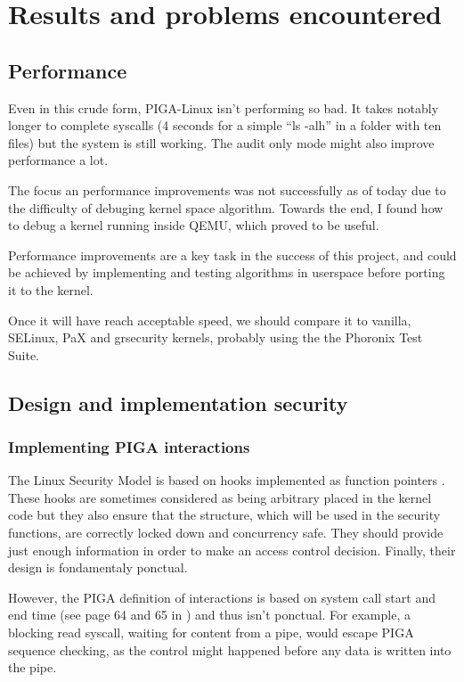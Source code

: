 \documentclass[pdftex,a4paper,titlepage,11pt]{article}
\begin{document}
\newpage

\section{Results and problems encountered}

\subsection{Performance}

Even in this crude form, PIGA-Linux isn't performing so bad. It takes notably
longer to complete syscalls (4 seconds for a simple ``ls -alh'' in a folder with
ten files) but the system is still working. The audit only mode might also
improve performance a lot.

The focus an performance improvements was not successfully as of today due to
the difficulty of debuging kernel space algorithm. Towards the end, I found
how to debug a kernel running inside QEMU, which proved to be useful.

Performance improvements are a key task in the success of this project, and
could be achieved by implementing and testing algorithms in userspace before
porting it to the kernel.

Once it will have reach acceptable speed, we should compare it to vanilla,
SELinux, PaX and grsecurity kernels, probably using the the Phoronix Test Suite.

\subsection{Design and implementation security}

\subsubsection{Implementing PIGA interactions}

The Linux Security Model is based on hooks implemented as function pointers
\cite{lsm2002linux}.
These hooks are sometimes considered as being arbitrary placed in the kernel
code \cite{grsecuritylsm} but they also ensure that the structure, which
will be used
in the security functions, are correctly locked down and concurrency safe. They
should provide just enough information in order to make an access control
decision. Finally, their design is fondamentaly ponctual.

\bigskip

However, the PIGA definition of interactions is based on system call start and
end time (see page 64 and 65 in \cite{theseJBriffaut}) and thus isn't ponctual.
For example, a blocking read syscall, waiting for content from a pipe, would
escape PIGA sequence checking, as the control might happened before any data is
written into the pipe.
\end{document}
